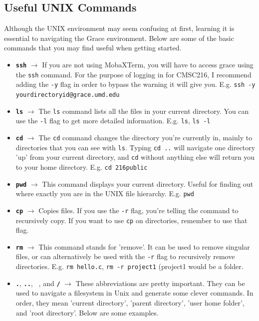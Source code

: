 \documentclass[english, 10pt]{article}
\begin{document}
\subsection{Useful UNIX Commands}

Although the UNIX environment may seem confusing at first, learning it is essential to navigating the Grace environment. Below are some of the basic commands that you may find useful when getting started.

\begin{itemize}
	\item \textbf{\texttt{ssh}} $\rightarrow$ If you are not using MobaXTerm, you will have to access grace using the \texttt{ssh} command. For the purpose of logging in for CMSC216, I recommend adding the \texttt{-y} flag in order to bypass the warning it will give you. E.g. \texttt{ssh -y yourdirectoryid@grace.umd.edu}
	\item \textbf{\texttt{ls}} $\rightarrow$ The \texttt{ls} command lists all the files in your current directory. You can use the \texttt{-l} flag to get more detailed information. E.g. \texttt{ls}, \texttt{ls -l}
	\item \textbf{\texttt{cd}} $\rightarrow$ The \texttt{cd} command changes the directory you're currently in, mainly to directories that you can see with \texttt{ls}. Typing \texttt{cd ..} will navigate one directory 'up' from your current directory, and \texttt{cd} without anything else will return you to your home directory. E.g. \texttt{cd 216public}
	\item \textbf{\texttt{pwd}} $\rightarrow$ This command displays your current directory. Useful for finding out where exactly you are in the UNIX file hierarchy. E.g. \texttt{pwd}
	\item \textbf{\texttt{cp}} $\rightarrow$ Copies files. If you use the \texttt{-r} flag, you're telling the command to recursively copy. If you want to use \texttt{cp} on directories, remember to use that flag.
	\item \textbf{\texttt{rm}} $\rightarrow$ This command stands for 'remove'. It can be used to remove singular files, or can alternatively be used with the \texttt{-r} flag to recursively remove directories. E.g. \texttt{rm hello.c}, \texttt{rm -r project1} (project1 would be a folder.
	\item \textbf{\texttt{.}}, \textbf{\texttt{..}}, \textbf{\texttt{~}}, and \textbf{\texttt{/}} $\rightarrow$ These abbreviations are pretty important. They can be used to navigate a filesystem in Unix and generate some clever commands. In order, they mean 'current directory', 'parent directory', 'user home folder', and 'root directory'. Below are some examples.

\end{itemize}
\end{document}
